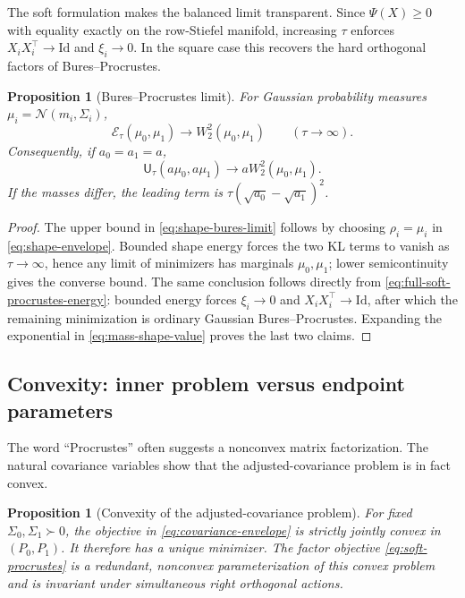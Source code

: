 \documentclass[11pt]{article}
\newtheorem{proposition}[theorem]{Proposition}
\theoremstyle{definition}
\theoremstyle{remark}
\newcommand{\Id}{\mathrm{Id}}
\newcommand{\UOT}{\mathsf U}
\newcommand{\cN}{\mathcal N}
\begin{document}
The soft formulation makes the balanced limit transparent. Since
$\Psi(X)\geq0$ with equality exactly on the row-Stiefel manifold, increasing
$\tau$ enforces $X_iX_i^\top\to\Id$ and $\xi_i\to0$. In the square case this
recovers the hard orthogonal factors of Bures--Procrustes.

\begin{proposition}[Bures--Procrustes limit]\label{prop:bures-limit}
For Gaussian probability measures $\mu_i=\cN(m_i,\Sigma_i)$,
\begin{equation}\label{eq:shape-bures-limit}
 \mathcal E_\tau(\mu_0,\mu_1)
 \longrightarrow W_2^2(\mu_0,\mu_1)
 \qquad(\tau\to\infty).
\end{equation}
Consequently, if $a_0=a_1=a$,
\begin{equation}\label{eq:uot-bures-limit}
 \UOT_\tau(a\mu_0,a\mu_1)
 \longrightarrow aW_2^2(\mu_0,\mu_1).
\end{equation}
If the masses differ, the leading term is
$\tau(\sqrt{a_0}-\sqrt{a_1})^2$.
\end{proposition}

\begin{proof}
The upper bound in \eqref{eq:shape-bures-limit} follows by choosing
$\rho_i=\mu_i$ in \eqref{eq:shape-envelope}. Bounded shape energy forces the
two KL terms to vanish as $\tau\to\infty$, hence any limit of minimizers has
marginals $\mu_0,\mu_1$; lower semicontinuity gives the converse bound. The
same conclusion follows directly from \eqref{eq:full-soft-procrustes-energy}:
bounded energy forces $\xi_i\to0$ and $X_iX_i^\top\to\Id$, after which the
remaining minimization is ordinary Gaussian Bures--Procrustes. Expanding the
exponential in \eqref{eq:mass-shape-value} proves the last two claims.
\end{proof}

\subsection{Convexity: inner problem versus endpoint parameters}

The word ``Procrustes'' often suggests a nonconvex matrix factorization. The
natural covariance variables show that the adjusted-covariance problem is in
fact convex.

\begin{proposition}[Convexity of the adjusted-covariance problem]
\label{prop:convex-inner-problem}
For fixed $\Sigma_0,\Sigma_1\succ0$, the objective in
\eqref{eq:covariance-envelope} is strictly jointly convex in $(P_0,P_1)$.
It therefore has a unique minimizer. The factor objective
\eqref{eq:soft-procrustes} is a redundant, nonconvex parameterization of this
convex problem and is invariant under simultaneous right orthogonal actions.
\end{proposition}
\end{document}
